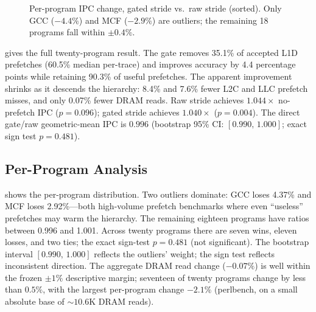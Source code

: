 \documentclass[sigplan,anonymous,review,nonacm]{acmart}
\begin{document}
\begin{figure}[t]
\centering
{}
\caption{Per-program IPC change, gated stride vs.\ raw stride (sorted).
Only GCC ($-4.4\%$) and MCF ($-2.9\%$) are outliers; the remaining 18
programs fall within ${\pm}0.4\%$.}
\label{fig:champsim_ipc}
\end{figure}

 gives the full twenty-program result. The gate removes
35.1\% of accepted L1D prefetches (60.5\% median per-trace) and improves
accuracy by 4.4 percentage points while retaining 90.3\% of useful
prefetches. The apparent improvement shrinks as it descends the hierarchy:
8.4\% and 7.6\% fewer L2C and LLC prefetch misses, and only 0.07\% fewer
DRAM reads. Raw stride achieves $1.044\times$ no-prefetch IPC ($p = 0.096$);
gated stride achieves $1.040\times$ ($p = 0.004$). The direct gate/raw
geometric-mean IPC is $0.996$ (bootstrap 95\% CI: $[0.990,\,1.000]$; exact
sign test $p = 0.481$).

\subsection{Per-Program Analysis}

 shows the per-program distribution. Two outliers
dominate: GCC loses 4.37\% and MCF loses 2.92\%---both high-volume prefetch
benchmarks where even ``useless'' prefetches may warm the hierarchy. The
remaining eighteen programs have ratios between 0.996 and 1.001. Across twenty
programs there are seven wins, eleven losses, and two ties; the exact
sign-test $p = 0.481$ (not significant). The bootstrap interval
$[0.990,\,1.000]$ reflects the outliers' weight; the sign test reflects
inconsistent direction. The aggregate DRAM read change ($-0.07\%$) is well within the frozen
${\pm}1\%$ descriptive margin; seventeen of twenty programs change by
less than $0.5\%$, with the largest per-program change $-2.1\%$
(perlbench, on a small absolute base of ${\sim}10.6$K DRAM reads).
\end{document}
